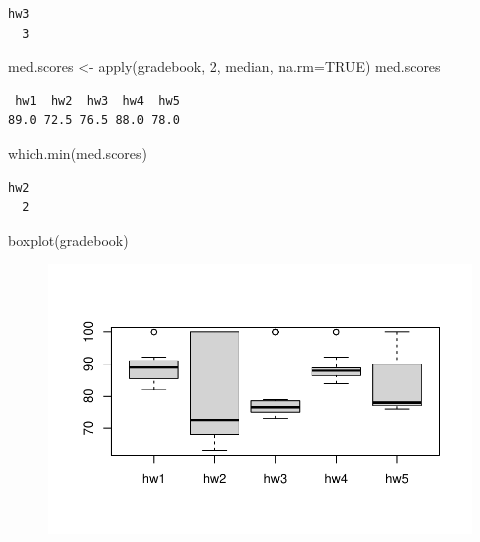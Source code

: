\documentclass[
  letterpaper,
  DIV=11,
  numbers=noendperiod]{scrartcl}
\newenvironment{Shaded}{\begin{snugshade}}{\end{snugshade}}
\newcommand{\AttributeTok}[1]{\textcolor[rgb]{0.40,0.45,0.13}{#1}}
\newcommand{\ConstantTok}[1]{\textcolor[rgb]{0.56,0.35,0.01}{#1}}
\newcommand{\DecValTok}[1]{\textcolor[rgb]{0.68,0.00,0.00}{#1}}
\newcommand{\FunctionTok}[1]{\textcolor[rgb]{0.28,0.35,0.67}{#1}}
\newcommand{\NormalTok}[1]{\textcolor[rgb]{0.00,0.23,0.31}{#1}}
\newcommand{\OtherTok}[1]{\textcolor[rgb]{0.00,0.23,0.31}{#1}}
\begin{document}
\begin{verbatim}
hw3 
  3 
\end{verbatim}

\begin{Shaded}
\begin{Highlighting}[]
\NormalTok{med.scores }\OtherTok{\textless{}{-}} \FunctionTok{apply}\NormalTok{(gradebook, }\DecValTok{2}\NormalTok{, median, }\AttributeTok{na.rm=}\ConstantTok{TRUE}\NormalTok{)}
\NormalTok{med.scores}
\end{Highlighting}
\end{Shaded}

\begin{verbatim}
 hw1  hw2  hw3  hw4  hw5 
89.0 72.5 76.5 88.0 78.0 
\end{verbatim}

\begin{Shaded}
\begin{Highlighting}[]
\FunctionTok{which.min}\NormalTok{(med.scores)}
\end{Highlighting}
\end{Shaded}

\begin{verbatim}
hw2 
  2 
\end{verbatim}

\begin{Shaded}
\begin{Highlighting}[]
\FunctionTok{boxplot}\NormalTok{(gradebook)}
\end{Highlighting}
\end{Shaded}

\begin{figure}[H]

{\centering \includegraphics{Class06LabQuarto_files/figure-pdf/unnamed-chunk-18-1.pdf}

}

\end{figure}
\end{document}

